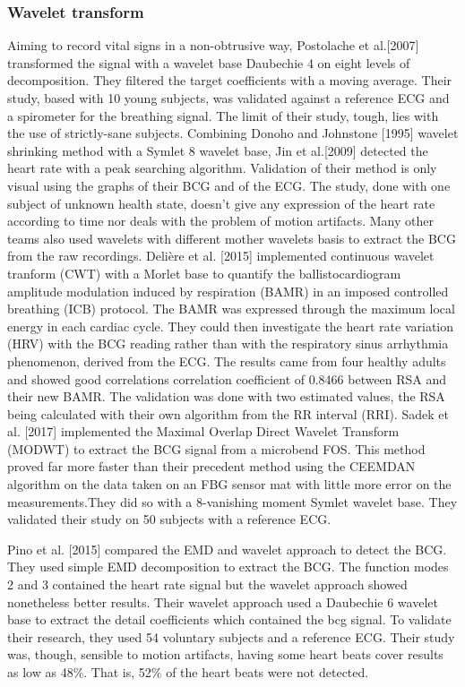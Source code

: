 \documentclass[twoside,onecolumn]{article}
\begin{document}
\subsubsection{Wavelet transform}
Aiming to record vital signs in a non-obtrusive way, Postolache et al.[2007] transformed the signal with a wavelet base Daubechie 4 on eight levels of decomposition. They filtered the target coefficients with a moving average. Their study, based with 10 young subjects, was validated against a reference ECG and a spirometer for the breathing signal. The limit of their study, tough, lies with the use of strictly-sane subjects. 
Combining Donoho and Johnstone [1995] wavelet shrinking method with a Symlet 8 wavelet base, Jin et al.[2009] detected the heart rate with a peak searching algorithm. Validation of their method is only visual using the graphs of their BCG and of the ECG. The study, done with one subject of unknown health state, doesn't give any expression of the heart rate according to time nor deals with the problem of motion artifacts.
Many other teams also used wavelets with different mother wavelets basis to extract the BCG from the raw recordings. Delière et al. [2015] implemented continuous wavelet tranform (CWT) with a Morlet base to quantify the ballistocardiogram amplitude modulation induced by respiration (BAMR) in an imposed controlled breathing (ICB) protocol. The BAMR was expressed through the maximum local energy in each cardiac cycle. They could then investigate the heart rate variation (HRV) with the BCG reading rather than with the respiratory sinus arrhythmia phenomenon, derived from the ECG. The results came from four healthy adults and showed good correlations correlation coefficient of 0.8466 between RSA and their new BAMR. The validation was done with two estimated values, the RSA being calculated with their own algorithm from the RR interval (RRI).
Sadek et al. [2017] implemented the Maximal Overlap Direct Wavelet Transform (MODWT) to extract the BCG signal from a microbend FOS. This method proved far more faster than their precedent method using the CEEMDAN algorithm on the data taken on an FBG sensor mat with little more error on the measurements.They did so with a 8-vanishing moment Symlet  wavelet base. They validated their study on 50 subjects with a reference ECG.

Pino et al. [2015] compared the EMD and wavelet approach to detect the BCG. They used simple EMD decomposition to extract the BCG. The function modes 2 and 3 contained the heart rate signal but the wavelet approach showed nonetheless better results. Their wavelet approach used a Daubechie 6 wavelet base to extract the detail coefficients which contained the bcg signal. To validate their research, they used 54 voluntary subjects and a reference ECG. Their study was, though, sensible to motion artifacts, having some heart beats cover results as low as 48\%. That is, 52\% of the heart beats were not detected.
\end{document}
